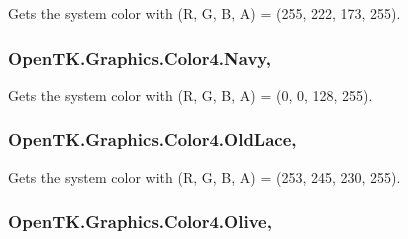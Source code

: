 Gets the system color with (R, G, B, A) = (255, 222, 173, 255). 

\hypertarget{struct_open_t_k_1_1_graphics_1_1_color4_addd7ea5390247d395007bced2dbbd70f}{
\subsubsection[{Navy}]{ Open\-T\-K.\-Graphics.\-Color4.\-Navy\hspace{0.3cm}{\ttfamily [static]}, {\ttfamily [get]}}}\label{struct_open_t_k_1_1_graphics_1_1_color4_addd7ea5390247d395007bced2dbbd70f}


Gets the system color with (R, G, B, A) = (0, 0, 128, 255). 

\hypertarget{struct_open_t_k_1_1_graphics_1_1_color4_a6efe7d2cfe56be58b481a5981cd69d92}{
\subsubsection[{Old\-Lace}]{ Open\-T\-K.\-Graphics.\-Color4.\-Old\-Lace\hspace{0.3cm}{\ttfamily [static]}, {\ttfamily [get]}}}\label{struct_open_t_k_1_1_graphics_1_1_color4_a6efe7d2cfe56be58b481a5981cd69d92}


Gets the system color with (R, G, B, A) = (253, 245, 230, 255). 

\hypertarget{struct_open_t_k_1_1_graphics_1_1_color4_ab3ed93f84edd164db94b884d602fa140}{
\subsubsection[{Olive}]{ Open\-T\-K.\-Graphics.\-Color4.\-Olive\hspace{0.3cm}{\ttfamily [static]}, {\ttfamily [get]}}}\label{struct_open_t_k_1_1_graphics_1_1_color4_ab3ed93f84edd164db94b884d602fa140}


